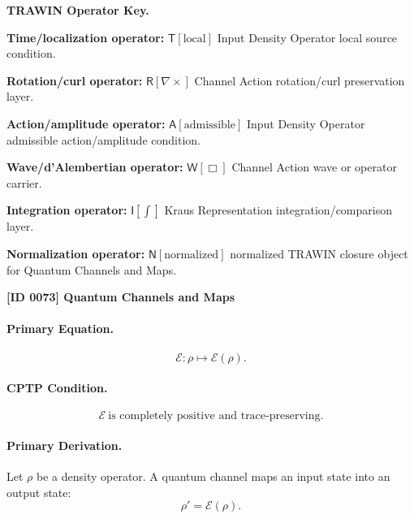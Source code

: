 \par\vspace{0.45\baselineskip}
\noindent\begin{minipage}[t]{\linewidth}
\begingroup
\small
\raggedright
\textbf{TRAWIN Operator Key.}\par
\noindent\textbf{Time/localization operator:} $\mathsf{T}\!\left[\mathrm{local}\right]$ Input Density Operator local source condition.\par
\noindent\textbf{Rotation/curl operator:} $\mathsf{R}\!\left[\nabla\times\right]$ Channel Action rotation/curl preservation layer.\par
\noindent\textbf{Action/amplitude operator:} $\mathsf{A}\!\left[\mathrm{admissible}\right]$ Input Density Operator admissible action/amplitude condition.\par
\noindent\textbf{Wave/d'Alembertian operator:} $\mathsf{W}\!\left[\Box\right]$ Channel Action wave or operator carrier.\par
\noindent\textbf{Integration operator:} $\mathsf{I}\!\left[\int\right]$ Kraus Representation integration/comparison layer.\par
\noindent\textbf{Normalization operator:} $\mathsf{N}\!\left[\mathrm{normalized}\right]$ normalized TRAWIN closure object for Quantum Channels and Maps.\par
\endgroup
\end{minipage}

\clearpage
\noindent\textbf{[ID 0073] Quantum Channels and Maps}\par
\vspace{0.35em}
\paragraph{Primary Equation.}
\begin{equation}
\mathcal{E}:\rho\mapsto \mathcal{E}(\rho).
\end{equation}

\paragraph{CPTP Condition.}
\begin{equation}
\mathcal{E}\ \text{is completely positive and trace-preserving}.
\end{equation}

\paragraph{Primary Derivation.}
Let $\rho$ be a density operator. A quantum channel maps an input state into an output state:
\begin{equation}
\rho'=\mathcal{E}(\rho).
\end{equation}

